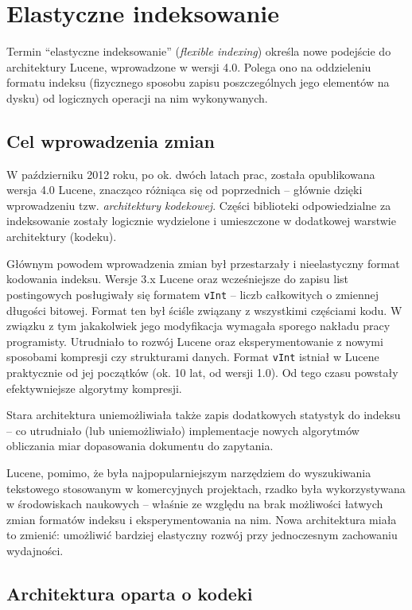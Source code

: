 \chapter{Elastyczne indeksowanie}

Termin ``elastyczne indeksowanie'' (\emph{flexible indexing}) określa nowe podejście do architektury Lucene, wprowadzone w wersji 4.0. Polega ono na oddzieleniu formatu indeksu (fizycznego sposobu zapisu poszczególnych jego elementów na dysku) od logicznych operacji na nim wykonywanych.

\section{Cel wprowadzenia zmian}

W październiku 2012 roku, po ok. dwóch latach prac, została opublikowana wersja 4.0 Lucene, znacząco różniąca się od poprzednich -- głównie dzięki wprowadzeniu tzw. \emph{architektury kodekowej}. Części biblioteki odpowiedzialne za indeksowanie zostały logicznie wydzielone i umieszczone w dodatkowej warstwie architektury (kodeku). 

Głównym powodem wprowadzenia zmian był przestarzały i nieelastyczny format kodowania indeksu. Wersje 3.x Lucene oraz wcześniejsze do zapisu list postingowych posługiwały się formatem \texttt{vInt} -- liczb całkowitych o zmiennej długości bitowej. Format ten był ściśle związany z wszystkimi częściami kodu. W związku z tym jakakolwiek jego modyfikacja wymagała sporego nakładu pracy programisty. Utrudniało to rozwój Lucene oraz eksperymentowanie z nowymi sposobami kompresji czy strukturami danych. Format \texttt{vInt} istniał w Lucene praktycznie od jej początków (ok. 10 lat, od wersji 1.0). Od tego czasu powstały efektywniejsze algorytmy kompresji.

Stara architektura uniemożliwiała także zapis dodatkowych statystyk do indeksu -- co utrudniało (lub uniemożliwiało) implementacje nowych algorytmów obliczania miar dopasowania dokumentu do zapytania.

Lucene, pomimo, że była najpopularniejszym narzędziem do wyszukiwania tekstowego stosowanym w komercyjnych projektach, rzadko była wykorzystywana w środowiskach naukowych -- właśnie ze względu na brak możliwości łatwych zmian formatów indeksu i eksperymentowania na nim. Nowa architektura miała to zmienić: umożliwić bardziej elastyczny rozwój przy jednoczesnym zachowaniu wydajności.

\section{Architektura oparta o kodeki}

